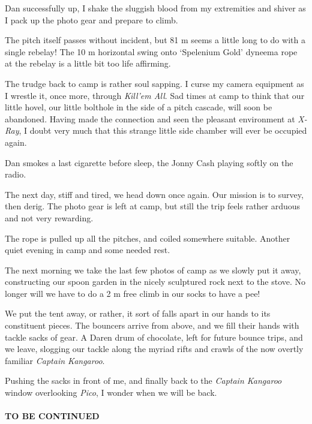 Dan successfully up, I shake the sluggish blood from my extremities and
shiver as I pack up the photo gear and prepare to climb.

The pitch itself passes without incident, but 81 m seems a little long
to do with a single rebelay! The 10 m horizontal swing onto `Spelenium
Gold' dyneema rope at the rebelay is a little bit too life affirming.

The trudge back to camp is rather soul sapping. I curse my camera
equipment as I wrestle it, once more, through \emph{Kill'em All}. Sad
times at camp to think that our little hovel, our little bolthole in the
side of a pitch cascade, will soon be abandoned. Having made the
connection and seen the pleasant environment at \emph{X-Ray}, I doubt
very much that this strange little side chamber will ever be occupied
again.

Dan smokes a last cigarette before sleep, the Jonny Cash playing softly
on the radio.

The next day, stiff and tired, we head down once again. Our mission is
to survey, then derig. The photo gear is left at camp, but still the
trip feels rather arduous and not very rewarding.

The rope is pulled up all the pitches, and coiled somewhere suitable.
Another quiet evening in camp and some needed rest.

The next morning we take the last few photos of camp as we slowly put it
away, constructing our spoon garden in the nicely sculptured rock next
to the stove. No longer will we have to do a 2 m free climb in our socks
to have a pee!

We put the tent away, or rather, it sort of falls apart in our hands to
its constituent pieces. The bouncers arrive from above, and we fill
their hands with tackle sacks of gear. A Daren drum of chocolate, left
for future bounce trips, and we leave, slogging our tackle along the
myriad rifts and crawls of the now overtly familiar \emph{Captain
Kangaroo}.

Pushing the sacks in front of me, and finally back to the \emph{Captain
Kangaroo} window overlooking \emph{Pico}, I wonder when we will be back.



\paragraph{TO BE CONTINUED}

